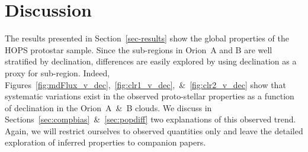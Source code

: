 \documentclass[manuscript]{aastex61}
\begin{document}
\section{Discussion}
\label{sec:discussion}
\par
The results presented in Section~\ref{sec-results} show the global properties of the HOPS protostar sample.  Since the sub-regions in Orion~A and B are well stratified by declination, differences are easily explored by using declination as a proxy for sub-region.   Indeed, Figures~\ref{fig:mdFlux_v_dec},~\ref{fig:clr1_v_dec},~\&~\ref{fig:clr2_v_dec} show that systematic variations exist in the observed proto-stellar properties as a function of declination in the Orion~A~\&~B clouds.  We discuss in Sections~\ref{sec:compbias}~\&~\ref{sec:popdiff} two explanations of this observed trend.   Again, we will restrict ourselves to observed quantities only and leave the detailed exploration of inferred properties to companion papers.
\end{document}
